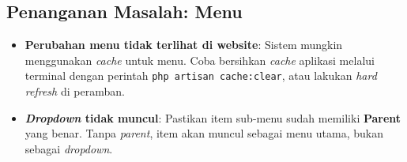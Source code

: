 \subsection{Penanganan Masalah: Menu}

\begin{itemize}
  \item \textbf{Perubahan menu tidak terlihat di website}: Sistem mungkin menggunakan
        \textit{cache} untuk menu. Coba bersihkan \textit{cache} aplikasi melalui
        terminal dengan perintah \lstinline{php artisan cache:clear}, atau lakukan
        \textit{hard refresh} di peramban.
  \item \textbf{\textit{Dropdown} tidak muncul}: Pastikan item sub-menu sudah memiliki
        \textbf{Parent} yang benar. Tanpa \textit{parent}, item akan muncul sebagai
        menu utama, bukan sebagai \textit{dropdown}.
\end{itemize}
